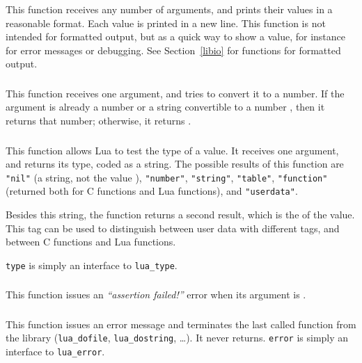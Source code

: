 \subsubsection*{}
This function receives any number of arguments,
and prints their values in a reasonable format.
Each value is printed in a new line.
This function is not intended for formatted output,
but as a quick way to show a value,
for instance for error messages or debugging.
See Section~\ref{libio} for functions for formatted output.

\subsubsection*{}
This function receives one argument,
and tries to convert it to a number.
If the argument is already a number or a string convertible
to a number , then it returns that number;
otherwise, it returns \nil.

\subsubsection*{}
This function allows Lua to test the type of a value.
It receives one argument, and returns its type, coded as a string.
The possible results of this function are
\verb'"nil"' (a string, not the value \nil),
\verb'"number"',
\verb'"string"',
\verb'"table"',
\verb'"function"' (returned both for C functions and Lua functions),
and \verb'"userdata"'.

Besides this string, the function returns a second result,
which is the  of the value.
This tag can be used to distinguish between user
data with different tags,
and between C functions and Lua functions.

\verb|type| is simply an interface to \verb|lua_type|.

\subsubsection*{}
This function issues an {\em ``assertion failed!''} error
when its argument is \nil.

\subsubsection*{}\label{pdf-error}
This function issues an error message and terminates
the last called function from the library
(\verb'lua_dofile', \verb'lua_dostring', \ldots).
It never returns.
\verb|error| is simply an interface to \verb|lua_error|.


